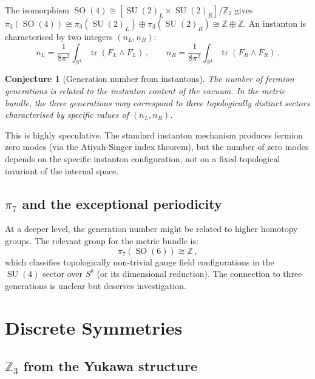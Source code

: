 \documentclass[12pt,a4paper]{article}
\newtheorem{conjecture}[theorem]{Conjecture}
\theoremstyle{definition}
\newcommand{\tr}{\operatorname{tr}}
\newcommand{\SO}{\operatorname{SO}}
\newcommand{\SU}{\operatorname{SU}}
\newcommand{\Z}{\mathbb{Z}}
\begin{document}
The isomorphism $\SO(4) \cong [\SU(2)_L \times \SU(2)_R]/\Z_2$ gives $\pi_3(\SO(4)) \cong \pi_3(\SU(2)_L) \oplus \pi_3(\SU(2)_R) \cong \Z \oplus \Z$.
An instanton is characterised by two integers $(n_L, n_R)$:
\begin{equation}
n_L = \frac{1}{8\pi^2} \int_{S^4} \tr(F_L \wedge F_L)\,,\qquad n_R = \frac{1}{8\pi^2} \int_{S^4} \tr(F_R \wedge F_R)\,.
\end{equation}

\begin{conjecture}[Generation number from instantons]
\label{conj:instanton}
The number of fermion generations is related to the instanton content of the vacuum.
In the metric bundle, the three generations may correspond to three topologically distinct sectors characterised by specific values of $(n_L, n_R)$.
\end{conjecture}

This is highly speculative.
The standard instanton mechanism produces fermion zero modes (via the Atiyah-Singer index theorem), but the number of zero modes depends on the specific instanton configuration, not on a fixed topological invariant of the internal space.

\subsection{$\pi_7$ and the exceptional periodicity}

At a deeper level, the generation number might be related to higher homotopy groups.
The relevant group for the metric bundle is:
\begin{equation}
\pi_7(\SO(6)) \cong \Z\,,
\end{equation}
which classifies topologically non-trivial gauge field configurations in the $\SU(4)$ sector over $S^8$ (or its dimensional reduction).
The connection to three generations is unclear but deserves investigation.


\section{Discrete Symmetries}
\label{sec:discrete}

\subsection{$\Z_3$ from the Yukawa structure}
\end{document}
